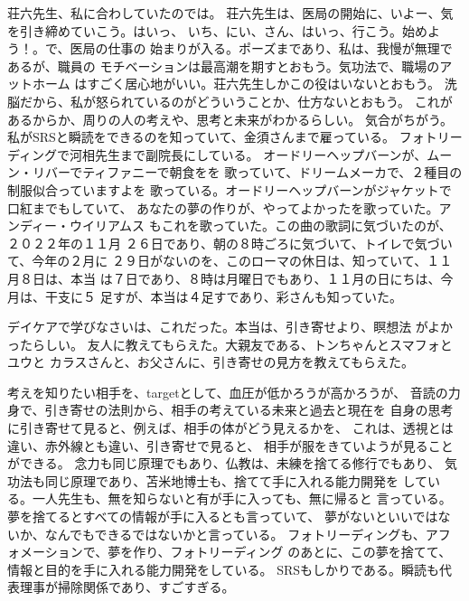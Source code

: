 \documentclass{jsarticle}
\begin{document}
      荘六先生、私に合わしていたのでは。 
      荘六先生は、医局の開始に、いよー、気を引き締めていこう。はいっ、
      いち、にい、さん、はいっ、行こう。始めよう！。で、医局の仕事の
      始まりが入る。ポーズまであり、私は、我慢が無理であるが、職員の
      モチベーションは最高潮を期すとおもう。気功法で、職場のアットホーム
      はすごく居心地がいい。荘六先生しかこの役はいないとおもう。
      洗脳だから、私が怒られているのがどういうことか、仕方ないとおもう。
      これがあるからか、周りの人の考えや、思考と未来がわかるらしい。
      気合がちがう。
      私がSRSと瞬読をできるのを知っていて、金須さんまで雇っている。
      フォトリーディングで河相先生まで副院長にしている。
      オードリーヘップバーンが、ムーン・リバーでティファニーで朝食をを
      歌っていて、ドリームメーカで、２種目の制服似合っていますよを
      歌っている。オードリーヘップバーンがジャケットで口紅までもしていて、
      あなたの夢の作りが、やってよかったを歌っていた。アンディー・ウイリアムス
      もこれを歌っていた。この曲の歌詞に気づいたのが、２０２２年の１１月
      ２６日であり、朝の８時ごろに気づいて、トイレで気づいて、今年の２月に
      ２９日がないのを、このローマの休日は、知っていて、１１月８日は、本当
      は７日であり、８時は月曜日でもあり、１１月の日にちは、今月は、干支に５
      足すが、本当は４足すであり、彩さんも知っていた。

 
      デイケアで学びなさいは、これだった。本当は、引き寄せより、瞑想法
      がよかったらしい。
      友人に教えてもらえた。大親友である、トンちゃんとスマフォとユウと
      カラスさんと、お父さんに、引き寄せの見方を教えてもらえた。


       考えを知りたい相手を、targetとして、血圧が低かろうが高かろうが、
   音読の力身で、引き寄せの法則から、相手の考えている未来と過去と現在を
   自身の思考に引き寄せて見ると、例えば、相手の体がどう見えるかを、
   これは、透視とは違い、赤外線とも違い、引き寄せで見ると、
   相手が服をきていようが見ることができる。
   念力も同じ原理でもあり、仏教は、未練を捨てる修行でもあり、
   気功法も同じ原理であり、苫米地博士も、捨てて手に入れる能力開発を
   している。一人先生も、無を知らないと有が手に入っても、無に帰ると
   言っている。夢を捨てるとすべての情報が手に入るとも言っていて、
   夢がないといいではないか、なんでもできるではないかと言っている。
   フォトリーディングも、アフォメーションで、夢を作り、フォトリーディング
   のあとに、この夢を捨てて、情報と目的を手に入れる能力開発をしている。
   SRSもしかりである。瞬読も代表理事が掃除関係であり、すごすぎる。
\end{document}
